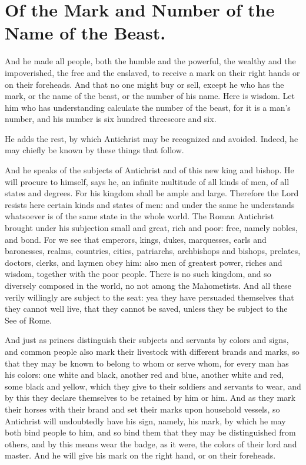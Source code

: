 \chapter[Sermon 61. Of the Mark and Number of the Name of the Beast.]{Of the Mark and Number of the Name of the Beast.}
\label{sermon:061}

And he made all people, both the humble and the powerful, the wealthy and the impoverished, the free and the enslaved, to receive a mark on their right hands or on their foreheads. And that no one might buy or sell, except he who has the mark, or the name of the beast, or the number of his name. Here is wisdom. Let him who has understanding calculate the number of the beast, for it is a man’s number, and his number is six hundred threescore and six.

He adds the rest, by which Antichrist may be recognized and avoided. Indeed, he may chiefly be known by these things that follow.

And he speaks of the subjects of Antichrist and of this new king and bishop. He will procure to himself, says he, an infinite multitude of all kinds of men, of all states and degrees. For his kingdom shall be ample and large. Therefore the Lord resists here certain kinds and states of men: and under the same he understands whatsoever is of the same state in the whole world. The Roman Antichrist brought under his subjection small and great, rich and poor: free, namely nobles, and bond. For we see that emperors, kings, dukes, marquesses, earls and baronesses, realms, countries, cities, patriarchs, archbishops and bishops, prelates, doctors, clerks, and laymen obey him: also men of greatest power, riches and wisdom, together with the poor people. There is no such kingdom, and so diversely composed in the world, no not among the Mahometists. And all these verily willingly are subject to the seat: yea they have persuaded themselves that they cannot well live, that they cannot be saved, unless they be subject to the See of Rome.

And just as princes distinguish their subjects and servants by colors and signs, and common people also mark their livestock with different brands and marks, so that they may be known to belong to whom or serve whom, for every man has his colors: one white and black, another red and blue, another white and red, some black and yellow, which they give to their soldiers and servants to wear, and by this they declare themselves to be retained by him or him. And as they mark their horses with their brand and set their marks upon household vessels, so Antichrist will undoubtedly have his sign, namely, his mark, by which he may both bind people to him, and so bind them that they may be distinguished from others, and by this means wear the badge, as it were, the colors of their lord and master. And he will give his mark on the right hand, or on their foreheads.

